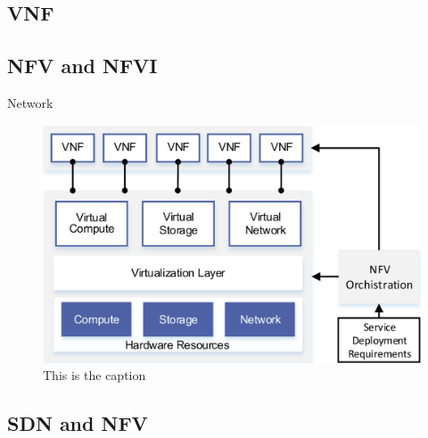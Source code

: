 \subsection{VNF}

\subsection{NFV and NFVI}

Network 

\begin{figure}[H]
	\centering
	\includegraphics[width=1\linewidth]{images/nfvi.png}
	\caption{This is the caption \cite{li2015software}}
	\label{img:nfvi}
\end{figure}

\subsection{SDN and NFV}

